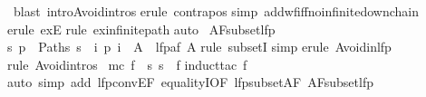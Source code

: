 \begin{isabellebody}
\ blast\ intro{\isacharcolon}Avoid{\isachardot}intros{\isacharparenright}\isanewline
{}erule\ contrapos\isanewline
{}simp\ add{\isacharcolon}wf{\isacharunderscore}iff{\isacharunderscore}no{\isacharunderscore}infinite{\isacharunderscore}down{\isacharunderscore}chain{\isacharparenright}\isanewline
{}erule\ exE{\isacharparenright}\isanewline
{}rule\ ex{\isacharunderscore}infinite{\isacharunderscore}path{\isacharparenright}\isanewline
{}auto{\isacharparenright}\isanewline
\isanewline
{}\ AF{\isacharunderscore}subset{\isacharunderscore}lfp{\isacharcolon}\isanewline
{\isachardoublequote}{\isacharbraceleft}s{\isachardot}\ {\isasymforall}p\ {\isasymin}\ Paths\ s{\isachardot}\ {\isasymexists}\ i{\isachardot}\ p\ i\ {\isasymin}\ A{\isacharbraceright}\ {\isasymsubseteq}\ lfp{\isacharparenleft}af\ A{\isacharparenright}{\isachardoublequote}\isanewline
{}rule\ subsetI{\isacharparenright}\isanewline
{}simp{\isacharparenright}\isanewline
{}erule\ Avoid{\isacharunderscore}in{\isacharunderscore}lfp{\isacharparenright}\isanewline
{}rule\ Avoid{\isachardot}intros{\isacharparenright}\isanewline
\isanewline
\isanewline
{}\ {\isachardoublequote}mc\ f\ {\isacharequal}\ {\isacharbraceleft}s{\isachardot}\ s\ {\isasymTurnstile}\ f{\isacharbraceright}{\isachardoublequote}\isanewline
{}induct{\isacharunderscore}tac\ f{\isacharparenright}\isanewline
{}auto\ simp\ add{\isacharcolon}\ lfp{\isacharunderscore}conv{\isacharunderscore}EF\ equalityI{\isacharbrackleft}OF\ lfp{\isacharunderscore}subset{\isacharunderscore}AF\ AF{\isacharunderscore}subset{\isacharunderscore}lfp{\isacharbrackright}{\isacharparenright}\isanewline
\isanewline
{}\isanewline
\end{isabellebody}%
